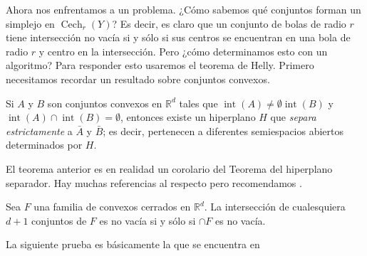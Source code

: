 \documentclass{standalone}
\begin{document}
	Ahora nos enfrentamos a un problema. ¿Cómo sabemos qué conjuntos forman un simplejo en $\operatorname{Cech}_{r}(Y)$? Es decir, es claro que un conjunto de bolas de radio $r$ tiene intersección no vacía si y sólo si sus centros se encuentran en una bola de radio $r$ y centro en la intersección. Pero ¿cómo determinamos esto con un algoritmo? Para responder esto usaremos el teorema de Helly. Primero necesitamos recordar un resultado sobre conjuntos convexos.
	
	\begin{theorem}\label{thm:hyperplane_separation_corolary}
		Si $A$ y $B$ son conjuntos convexos en $\mathbb{R}^{d}$ tales que $\operatorname{int}(A)\neq\emptyset\operatorname{int}(B)$ y $\operatorname{int}(A)\cap \operatorname{int}(B) = \emptyset$, entonces existe un hiperplano $H$ que \emph{separa estrictamente} a $\bar{A}$ y $\bar{B}$; es decir, pertenecen a diferentes semiespacios abiertos determinados por $H$.
	\end{theorem}
	
	El teorema anterior es en realidad un corolario del Teorema del hiperplano separador. Hay muchas referencias al respecto pero recomendamos \cite[Sección 3.6]{leonard:2015:convex}.
		
	\begin{theorem}\label{thm:helly}
		Sea $F$ una familia de convexos cerrados en $\mathbb{R}^{d}$. La intersección de cualesquiera $d+1$ conjuntos de $F$ es no vacía si y sólo si $\cap F$ es no vacía.
	\end{theorem} 
	
	La siguiente prueba es básicamente la que se encuentra en \cite[Capítulo Complexes]{edelsbrunner:2010:computational}
	
\end{document}
